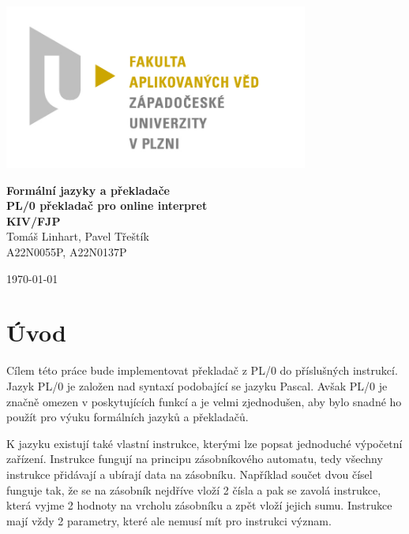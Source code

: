 \documentclass[12pt, letterpaper]{article}
\begin{document}
\begin{titlepage}
\centerline{\includegraphics[width=10cm]{img/logo.jpg}}
\begin{center}
\vspace{30px}
{\huge
\textbf{Formální jazyky a překladače}\\
\textbf{PL/0 překladač pro online interpret}\\
\vspace{1cm}
}
{\large
\textbf{KIV/FJP}\\
\vspace{1cm}
}
\vspace{1cm}
{\large
Tomáš Linhart, Pavel Třeštík\\
}
{\normalsize
A22N0055P, A22N0137P
}
\end{center}
\vspace{\fill}
\hfill
\begin{minipage}[t]{7cm}
\flushright
\today
\end{minipage}
\end{titlepage}
\section{Úvod}
Cílem této práce bude implementovat překladač z  PL/0 do příslušných instrukcí. Jazyk PL/0
je založen nad syntaxí podobající se jazyku Pascal. Avšak PL/0 je značně omezen v poskytujících funkcí a je velmi 
zjednodušen, aby bylo snadné ho použít pro výuku formálních jazyků a překladačů.

K jazyku existují také vlastní instrukce, kterými lze popsat jednoduché výpočetní zařízení. Instrukce fungují na 
principu zásobníkového automatu, tedy všechny instrukce přidávají a ubírají data na zásobníku. Například součet dvou
čísel funguje tak, že se na zásobník nejdříve vloží 2 čísla a pak se zavolá instrukce, která vyjme 2 hodnoty na vrcholu
zásobníku a zpět vloží jejich sumu. Instrukce mají vždy 2 parametry, které ale nemusí mít pro instrukci význam.
\end{document}
